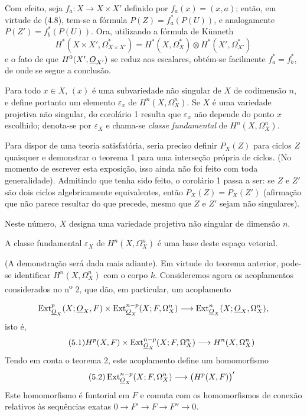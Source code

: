 Com efeito, seja $f_a:X\longrightarrow X\times X'$ definido por
$f_a(x)=(x,a)$; então, em virtude de (4.8), tem-se a fórmula
$P(Z)=f_a^{*}(P(U))$, e analogamente $P(Z')=f_b^{*}(P(U))$. Ora, utilizando a fórmula de
Künneth
\[
  H^{*}(X\times X',\Omega_{X\times X'}^{*})
  =H^{*}(X,\Omega_X^{*})\otimes H^{*}(X',\Omega_{X'}^{*})
\]
e o fato de que $H^{0}(X',\underline{O}_{X'})$ se reduz aos escalares, obtém-se
facilmente $f_a^{*}=f_b^{*}$, de onde se segue a conclusão.

Para todo $x\in X$, $(x)$ é uma subvariedade não singular de $X$ de
codimensão $n$, e define portanto um elemento $\varepsilon_x$ de
$H^{n}(X,\Omega_X^{n})$. Se $X$ é uma variedade projetiva não singular, do
corolário 1 resulta que $\varepsilon_x$ não depende do ponto $x$ escolhido; denota-se
por $\varepsilon_X$ e chama-se \emph{classe fundamental} de
$H^{n}(X,\Omega_X^{n})$.

 Para dispor de uma teoria satisfatória, seria preciso definir
$P_X(Z)$ para ciclos $Z$ quaisquer e demonstrar o teorema 1 para uma
interseção própria de ciclos. (No momento de escrever esta exposição, isso ainda não foi
feito com toda generalidade). Admitindo que tenha sido feito, o corolário 1
passa a ser: se $Z$ e $Z'$ são dois ciclos algebricamente equivalentes, então
$P_X(Z)=P_X(Z')$ (afirmação que não parece resultar do que precede, mesmo que
$Z$ e $Z'$ sejam não singulares).


Neste número, $X$ designa uma variedade projetiva não singular de dimensão
$n$.

 A classe fundamental $\varepsilon_X$ de
$H^{n}(X,\Omega_X^{n})$ é uma base deste espaço vetorial.

(A demonstração será dada mais adiante). Em virtude do teorema anterior, pode-se
identificar $H^{n}(X,\Omega_X^{n})$ com o corpo $k$. Consideremos agora os
acoplamentos considerados no n\textsuperscript{o} 2, que dão, em particular, um
acoplamento

\[
\operatorname{Ext}_{\underline{O}_X}^{p}(X;\underline{O}_X,F)
\times\operatorname{Ext}_{\underline{O}_X}^{n-p}(X;F,\Omega_X^{n})
\longrightarrow
\operatorname{Ext}_{\underline{O}_X}^{n}(X;\underline{O}_X,\Omega_X^{n}),
\]
isto é,
\begin{equation}\tag{5.1}
  H^{p}(X,F)
  \times\operatorname{Ext}_{\underline{O}_X}^{n-p}(X;F,\Omega_X^{n})
  \longrightarrow H^{n}(X,\Omega_X^{n})
\end{equation}
Tendo em conta o teorema 2, este acoplamento define um homomorfismo
\begin{equation}\tag{5.2}
  \operatorname{Ext}_{\underline{O}_X}^{n-p}(X;F,\Omega_X^{n})
  \longrightarrow\bigl(H^{p}(X,F)\bigr)'
\end{equation}
Este homomorfismo é funtorial em $F$ e comuta com os homomorfismos de conexão
relativos às sequências exatas $0\longrightarrow F'\longrightarrow F
\longrightarrow F''\longrightarrow0$.

